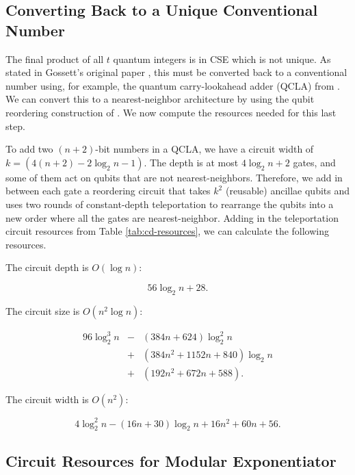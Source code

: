 \subsection{Converting Back to a Unique Conventional Number}
\label{subsec:qcla}

The final product of all $t$ quantum integers is in CSE which is not
unique. As stated in Gossett's original paper \cite{Gossett1998}, this
must be converted back to a conventional number using, for example, the
quantum carry-lookahead adder (QCLA) from \cite{Draper2004}. We can convert
this to a nearest-neighbor architecture by using the qubit reordering
construction of \cite{Rosenbaum2012}. We now compute the resources
needed for this last step.

To add two $(n+2)$-bit numbers in a QCLA, we have a circuit width of
$k = (4(n+2) - 2\log_2 n - 1)$. The depth is at most $4\log_2 n +2$ gates,
and some of them act on qubits that are not nearest-neighbors. Therefore,
we add in between each gate a reordering circuit that takes $k^2$
(reusable) ancillae
qubits and uses two rounds of constant-depth teleportation to rearrange
the qubits into a new order where all the gates are nearest-neighbor.
Adding in the teleportation circuit resources from Table \ref{tab:cd-resources},
we can calculate the following resources.

The circuit depth is $O(\log n)$:

\begin{equation}
56\log_2 n + 28\text{.}
\end{equation}

The circuit size is $O(n^2 \log n)$:

\begin{eqnarray}
96 \log_2^3 n & - & (384n + 624)\log_2^2 n \nonumber \\
              & + & (384n^2 + 1152n + 840) \log_2 n \nonumber \\
              & + & (192n^2 + 672n + 588)\text{.}
\end{eqnarray}

The circuit width is $O(n^2)$:

\begin{equation}
4 \log_2^2 n - (16n + 30)\log_2 n + 16n^2 + 60n + 56\text{.}
\end{equation}


\subsection{Circuit Resources for Modular Exponentiator}
\label{subsec:modexp-resources}

